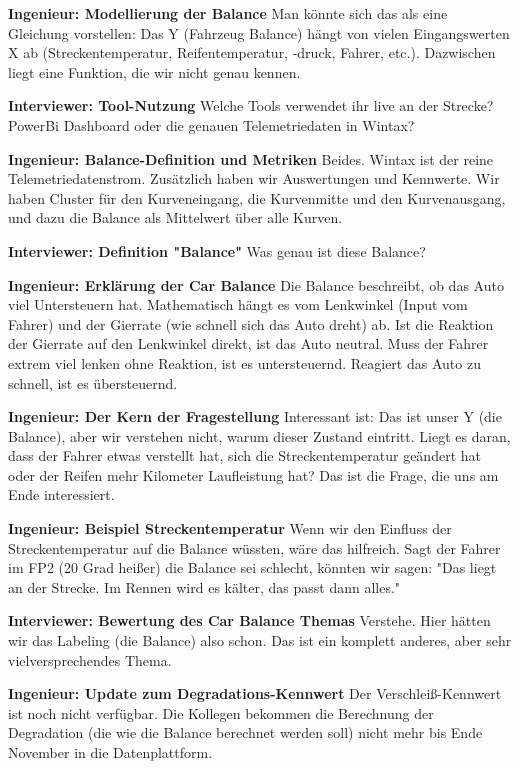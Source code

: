\textbf{Ingenieur: Modellierung der Balance}
Man könnte sich das als eine Gleichung vorstellen: Das Y (Fahrzeug Balance) hängt von vielen Eingangswerten X ab (Streckentemperatur, Reifentemperatur, -druck, Fahrer, etc.). Dazwischen liegt eine Funktion, die wir nicht genau kennen.

\textbf{Interviewer: Tool-Nutzung}
Welche Tools verwendet ihr live an der Strecke? PowerBi Dashboard oder die genauen Telemetriedaten in Wintax?

\textbf{Ingenieur: Balance-Definition und Metriken}
Beides. Wintax ist der reine Telemetriedatenstrom. Zusätzlich haben wir Auswertungen und Kennwerte. Wir haben Cluster für den Kurveneingang, die Kurvenmitte und den Kurvenausgang, und dazu die Balance als Mittelwert über alle Kurven.

\textbf{Interviewer: Definition "Balance"}
Was genau ist diese Balance?

\textbf{Ingenieur: Erklärung der Car Balance}
Die Balance beschreibt, ob das Auto viel Untersteuern hat. Mathematisch hängt es vom Lenkwinkel (Input vom Fahrer) und der Gierrate (wie schnell sich das Auto dreht) ab. Ist die Reaktion der Gierrate auf den Lenkwinkel direkt, ist das Auto neutral. Muss der Fahrer extrem viel lenken ohne Reaktion, ist es untersteuernd. Reagiert das Auto zu schnell, ist es übersteuernd.

\textbf{Ingenieur: Der Kern der Fragestellung}
Interessant ist: Das ist unser Y (die Balance), aber wir verstehen nicht, warum dieser Zustand eintritt. Liegt es daran, dass der Fahrer etwas verstellt hat, sich die Streckentemperatur geändert hat oder der Reifen mehr Kilometer Laufleistung hat? Das ist die Frage, die uns am Ende interessiert.

\textbf{Ingenieur: Beispiel Streckentemperatur}
Wenn wir den Einfluss der Streckentemperatur auf die Balance wüssten, wäre das hilfreich. Sagt der Fahrer im FP2 (20 Grad heißer) die Balance sei schlecht, könnten wir sagen: "Das liegt an der Strecke. Im Rennen wird es kälter, das passt dann alles."

\textbf{Interviewer: Bewertung des Car Balance Themas}
Verstehe. Hier hätten wir das Labeling (die Balance) also schon. Das ist ein komplett anderes, aber sehr vielversprechendes Thema.

\textbf{Ingenieur: Update zum Degradations-Kennwert}
Der Verschleiß-Kennwert ist noch nicht verfügbar. Die Kollegen bekommen die Berechnung der Degradation (die wie die Balance berechnet werden soll) nicht mehr bis Ende November in die Datenplattform.


